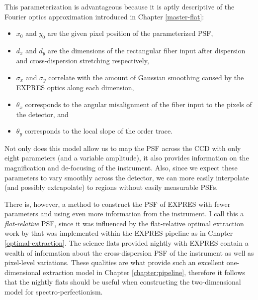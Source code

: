 This parameterization is advantageous because it is aptly descriptive of the Fourier optics approximation introduced in Chapter \ref{master-flat}:
\begin{itemize}
    \item $x_0$ and $y_0$ are the given pixel position of the parameterized PSF,
    \item $d_x$ and $d_y$ are the dimensions of the rectangular fiber input after dispersion and cross-dispersion stretching respectively,
    \item $\sigma_x$ and $\sigma_y$ correlate with the amount of Gaussian smoothing caused by the EXPRES optics along each dimension,
    \item $\theta_x$ corresponds to the angular misalignment of the fiber input to the pixels of the detector, and
    \item $\theta_y$ corresponds to the local slope of the order trace.
\end{itemize}
Not only does this model allow us to map the PSF across the CCD with only eight parameters (and a variable amplitude), it also provides information on the magnification and de-focusing of the instrument. Also, since we expect these parameters to vary smoothly across the detector, we can more easily interpolate (and possibly extrapolate) to regions without easily measurable PSFs.

There is, however, a method to construct the PSF of EXPRES with fewer parameters and using even more information from the instrument. I call this a \textit{flat-relative} PSF, since it was influenced by the flat-relative optimal extraction work by \citet{zechmeister_flat-relative_2014} that was implemented within the EXPRES pipeline as in Chapter \ref{optimal-extraction}. The science flats provided nightly with EXPRES contain a wealth of information about the cross-dispersion PSF of the instrument as well as pixel-level variations. These qualities are what provide such an excellent one-dimensional extraction model in Chapter \ref{chapter:pipeline}, therefore it follows that the nightly flats should be useful when constructing the two-dimensional model for spectro-perfectionism.


